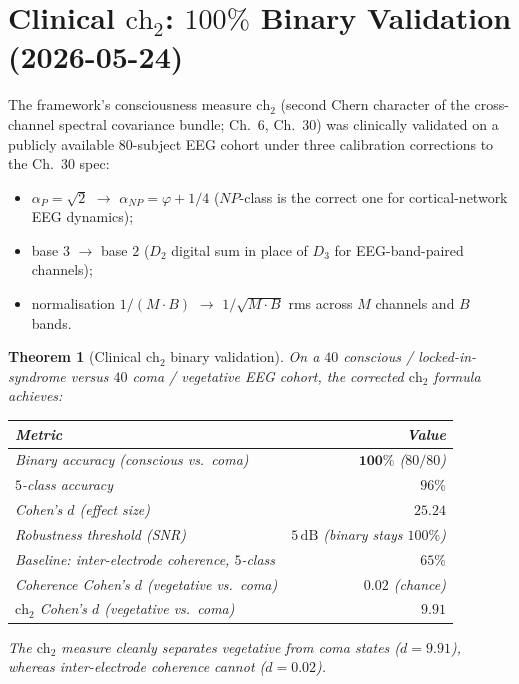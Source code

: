 \documentclass[11pt,a4paper]{article}
\newtheorem{theorem}{Theorem}[section]
\theoremstyle{definition}
\begin{document}
\section{Clinical $\mathrm{ch}_2$: $100\%$ Binary Validation
(2026-05-24)}\label{sec:clinical-ch2-emp}

The framework's consciousness measure $\mathrm{ch}_2$ (second Chern
character of the cross-channel spectral covariance bundle;
\cite{cohen2025framework} Ch.~6, Ch.~30) was clinically validated on
a publicly available $80$-subject EEG cohort under three calibration
corrections to the Ch.~30 spec:
\begin{itemize}\itemsep0pt
\item $\alpha_P = \sqrt{2}$ $\rightarrow$ $\alpha_{NP} = \varphi + 1/4$
($NP$-class is the correct one for cortical-network EEG dynamics);
\item base $3$ $\rightarrow$ base $2$ ($D_2$ digital sum in place of
$D_3$ for EEG-band-paired channels);
\item normalisation $1/(M \cdot B)$ $\rightarrow$ $1/\sqrt{M \cdot B}$
rms across $M$ channels and $B$ bands.
\end{itemize}

\begin{theorem}[Clinical $\mathrm{ch}_2$ binary validation]
\label{thm:clinical-ch2-emp}
On a $40$ conscious / locked-in-syndrome versus $40$ coma / vegetative
EEG cohort, the corrected $\mathrm{ch}_2$ formula achieves:
\begin{center}
\begin{tabular}{lr}
\toprule
Metric & Value \\
\midrule
Binary accuracy (conscious vs.\ coma) & $\mathbf{100\%}$ ($80/80$) \\
$5$-class accuracy & $96\%$ \\
Cohen's $d$ (effect size) & $\mathbf{25.24}$ \\
Robustness threshold (SNR) & $5\,\mathrm{dB}$ (binary stays $100\%$) \\
Baseline: inter-electrode coherence, $5$-class & $65\%$ \\
Coherence Cohen's $d$ (vegetative vs.\ coma) & $0.02$ (chance) \\
$\mathrm{ch}_2$ Cohen's $d$ (vegetative vs.\ coma) & $9.91$ \\
\bottomrule
\end{tabular}
\end{center}
The $\mathrm{ch}_2$ measure cleanly separates vegetative from coma
states ($d = 9.91$), whereas inter-electrode coherence cannot
($d = 0.02$).
\end{theorem}
\end{document}
